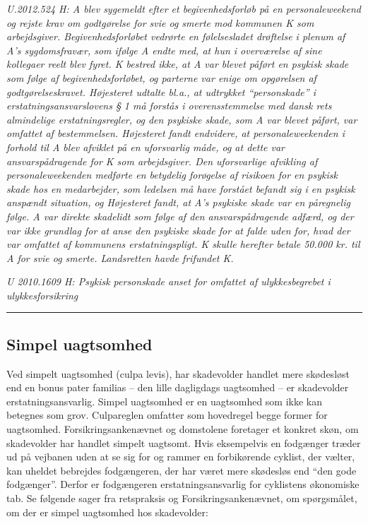 \documentclass[]{book}
\begin{document}
\emph{U.2012.524 H: A blev sygemeldt efter et begivenhedsforløb på en personaleweekend og rejste krav om godtgørelse for svie og smerte mod kommunen K som arbejdsgiver. Begivenhedsforløbet vedrørte en følelsesladet drøftelse i plenum af A's sygdomsfravær, som ifølge A endte med, at hun i overværelse af sine kollegaer reelt blev fyret. K bestred ikke, at A var blevet påført en psykisk skade som følge af begivenhedsforløbet, og parterne var enige om opgørelsen af godtgørelseskravet. Højesteret udtalte bl.a., at udtrykket ``personskade'' i erstatningsansvarslovens § 1 må forstås i overensstemmelse med dansk rets almindelige erstatningsregler, og den psykiske skade, som A var blevet påført, var omfattet af bestemmelsen. Højesteret fandt endvidere, at personaleweekenden i forhold til A blev afviklet på en uforsvarlig måde, og at dette var ansvarspådragende for K som arbejdsgiver. Den uforsvarlige afvikling af personaleweekenden medførte en betydelig forøgelse af risikoen for en psykisk skade hos en medarbejder, som ledelsen må have forstået befandt sig i en psykisk anspændt situation, og Højesteret fandt, at A's psykiske skade var en påregnelig følge. A var direkte skadelidt som følge af den ansvarspådragende adfærd, og der var ikke grundlag for at anse den psykiske skade for at falde uden for, hvad der var omfattet af kommunens erstatningspligt. K skulle herefter betale 50.000 kr. til A for svie og smerte. Landsretten havde frifundet K.}

\emph{U 2010.1609 H: Psykisk personskade anset for omfattet af ulykkesbegrebet i ulykkesforsikring}

\begin{center}\rule{0.5\linewidth}{\linethickness}\end{center}

\hypertarget{simpel-uagtsomhed}{%
\subsection{Simpel uagtsomhed}\label{simpel-uagtsomhed}}

Ved simpelt uagtsomhed (culpa levis), har skadevolder handlet mere skødesløst end en bonus pater familias -- den lille dagligdags uagtsomhed -- er skadevolder erstatningsansvarlig. Simpel uagtsomhed er en uagtsomhed som ikke kan betegnes som grov. Culpareglen omfatter som hovedregel begge former for uagtsomhed. Forsikringsankenævnet og domstolene foretager et konkret skøn, om skadevolder har handlet simpelt uagtsomt. Hvis eksempelvis en fodgænger træder ud på vejbanen uden at se sig for og rammer en forbikørende cyklist, der vælter, kan uheldet bebrejdes fodgængeren, der har været mere skødesløs end ``den gode fodgænger''. Derfor er fodgængeren erstatningsansvarlig for cyklistens økonomiske tab. Se følgende sager fra retspraksis og Forsikringsankenævnet, om spørgsmålet, om der er simpel uagtsomhed hos skadevolder:
\end{document}
